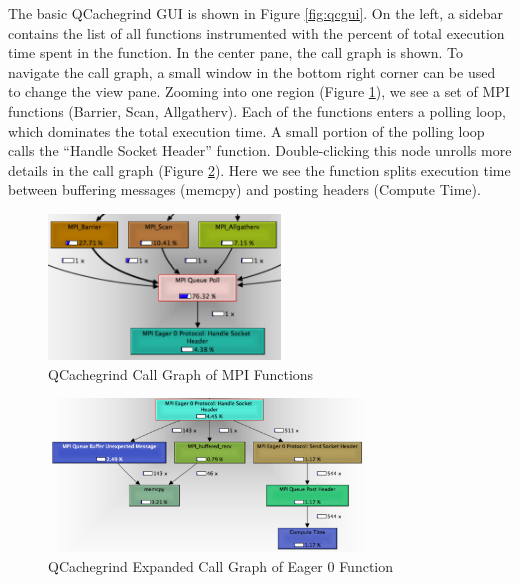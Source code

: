 The basic QCachegrind GUI is shown in Figure \ref{fig:qcgui}.  
On the left, a sidebar contains the list of all functions instrumented with the percent of total execution time spent in the function.
In the center pane, the call graph is shown.  
To navigate the call graph, a small window in the bottom right corner can be used to change the view pane.
Zooming into one region (Figure \ref{fig:qcgraphone}), we see a set of MPI functions (Barrier, Scan, Allgatherv).
Each of the functions enters a polling loop, which dominates the total execution time.  
A small portion of the polling loop calls the ``Handle Socket Header'' function.
Double-clicking this node unrolls more details in the call graph (Figure \ref{fig:qcgraphtwo}).
Here we see the function splits execution time between buffering messages (memcpy) and posting headers (Compute Time).

\begin{figure}[h!]
\centering
\includegraphics[width=0.55\textwidth]{figures/graphviz/callgraph1.pdf}
\caption{QCachegrind Call Graph of MPI Functions}
\label{fig:qcgraphone}
\end{figure}

\begin{figure}[h!]
\centering
\includegraphics[width=0.75\textwidth]{figures/graphviz/callgraph2.pdf}
\caption{QCachegrind Expanded Call Graph of Eager 0 Function}
\label{fig:qcgraphtwo}
\end{figure}
